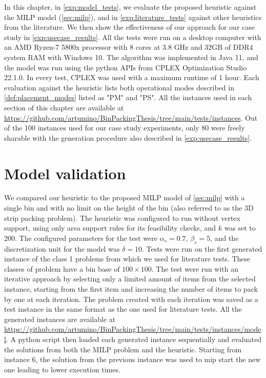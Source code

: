 In this chapter, in \cref{exp:model_tests}, we evaluate the proposed heuristic against the MILP model (\ref{sec:milp}), and in \cref{exp:literature_tests} against other heuristics from the literature. We then show the effectiveness of our approach for our case study in \cref{exp:usecase_results}.
All the tests were run on a desktop computer with an AMD Ryzen-7 5800x processor with 8 cores at 3.8 GHz and 32GB of DDR4 system RAM with Windows 10. The algorithm was implemented in Java 11, and the model was run using the python APIs from CPLEX Optimization Studio 22.1.0.
In every test, CPLEX was used with a maximum runtime of 1 hour.
Each evaluation against the heuristic lists both operational modes described in \cref{def:placement_modes} listed as "PM" and "PS".
All the instances used in each section of this chapter are available at \url{https://github.com/artumino/BinPackingThesis/tree/main/tests/instances}.
Out of the 100 instances used for our case study experiments, only 80 were freely sharable with the generation procedure also described in \cref{exp:usecase_results}.

\section{Model validation}
We compared our heuristic to the proposed MILP model of \cref{sec:milp} with a single bin and with no limit on the height of the bin (also referred to as the 3D strip packing problem).
The heuristic was configured to run without vertex support, using only area support rules for its feasibility checks, and $k$ was set to $200$.
The configured parameters for the test were $\alpha_s = 0.7$, $\beta_s = 5$, and the discretization unit for the model was $\delta = 10$. 
Tests were run on the first generated instance of the class 1 problems from \cite{martello2000three} which we used for literature tests. These classes of problem have a bin base of $100 \times 100$.
The test were run with an iterative approach by selecting only a limited amount of items from the selected instance, starting from the first item and increasing the number of items to pack by one at each iteration.
The problem created with each iteration was saved as a test instance in the same format as the one used for literature tests.
All the generated instances are available at \url{https://github.com/artumino/BinPackingThesis/tree/main/tests/instances/model}.
A python script then loaded each generated instance sequentially and evaluated the solutions from both the MILP problem and the heuristic. %
Starting from instance 6, the solution from the previous instance was used to mip start the new one leading to lower execution times.

